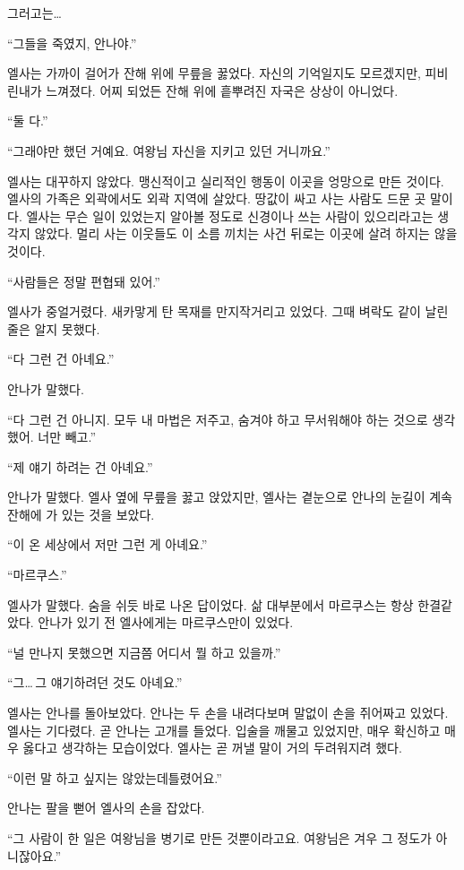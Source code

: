 그러고는\ldots

``그들을 죽였지, 안나야.''

엘사는 가까이 걸어가 잔해 위에 무릎을 꿇었다. 자신의 기억일지도 모르겠지만, 피비린내가 느껴졌다. 어찌 되었든 잔해 위에 흩뿌려진 자국은 상상이 아니었다.

``둘 다.''

``그래야만 했던 거예요. 여왕님 자신을 지키고 있던 거니까요.''

엘사는 대꾸하지 않았다. 맹신적이고 실리적인 행동이 이곳을 엉망으로 만든 것이다. 엘사의 가족은 외곽에서도 외곽 지역에 살았다. 땅값이 싸고 사는 사람도 드문 곳 말이다. 엘사는 무슨 일이 있었는지 알아볼 정도로 신경이나 쓰는 사람이 있으리라고는 생각지 않았다. 멀리 사는 이웃들도 이 소름 끼치는 사건 뒤로는 이곳에 살려 하지는 않을 것이다.

``사람들은 정말 편협돼 있어.''

엘사가 중얼거렸다. 새카맣게 탄 목재를 만지작거리고 있었다. 그때 벼락도 같이 날린 줄은 알지 못했다.

``다 그런 건 아녜요.''

안나가 말했다.

``다 그런 건 아니지. 모두 내 마법은 저주고, 숨겨야 하고 무서워해야 하는 것으로 생각했어. 너만 빼고.''

``제 얘기 하려는 건 아녜요.''

안나가 말했다. 엘사 옆에 무릎을 꿇고 앉았지만, 엘사는 곁눈으로 안나의 눈길이 계속 잔해에 가 있는 것을 보았다.

``이 온 세상에서 저만 그런 게 아녜요.''

``마르쿠스.''

엘사가 말했다. 숨을 쉬듯 바로 나온 답이었다. 삶 대부분에서 마르쿠스는 항상 한결같았다. 안나가 있기 전 엘사에게는 마르쿠스만이 있었다.

``널 만나지 못했으면 지금쯤 어디서 뭘 하고 있을까.''

``그\ldots\,그 얘기하려던 것도 아녜요.''

엘사는 안나를 돌아보았다. 안나는 두 손을 내려다보며 말없이 손을 쥐어짜고 있었다. 엘사는 기다렸다. 곧 안나는 고개를 들었다. 입술을 깨물고 있었지만, 매우 확신하고 매우 옳다고 생각하는 모습이었다. 엘사는 곧 꺼낼 말이 거의 두려워지려 했다.

``이런 말 하고 싶지는 않았는데 틀렸어요.''

안나는 팔을 뻗어 엘사의 손을 잡았다.

``그 사람이 한 일은 여왕님을 병기로 만든 것뿐이라고요. 여왕님은 겨우 그 정도가 아니잖아요.''

